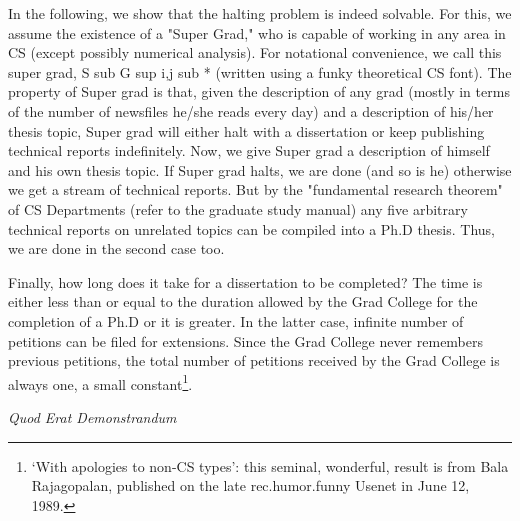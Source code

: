 In the following, we show that the halting problem is indeed solvable. For this, we assume the existence of a "Super Grad," who is capable of working in any area in CS (except possibly numerical analysis). For notational convenience, we call this super grad, S sub G sup i,j sub * (written using a funky theoretical CS font). The property of Super grad is that, given the description of any grad (mostly in terms of the number of newsfiles he/she reads every day) and a description of his/her thesis topic, Super grad will either halt with a dissertation or keep publishing technical reports indefinitely. Now, we give Super grad a description of himself and his own thesis topic. If Super grad halts, we are done (and so is he) otherwise we get a stream of technical reports. But by the "fundamental research theorem" of CS Departments (refer to the graduate study manual) any five arbitrary technical reports on unrelated topics can be compiled into a Ph.D thesis. Thus, we are done in the second case too.

Finally, how long does it take for a dissertation to be completed? The time is either less than or equal to the duration allowed by the Grad College for the completion of a Ph.D or it is greater. In the latter case, infinite number of petitions can be filed for extensions. Since the Grad College never remembers previous petitions, the total number of petitions received by the Grad College is always one, a small constant\footnote{`With apologies to non-CS types': this seminal, wonderful, result is from Bala Rajagopalan, published on the late rec.humor.funny Usenet in June 12, 1989.}.

\bigskip
\bigskip
\bigskip
\bigskip
\bigskip
\bigskip
\bigskip
\bigskip
\bigskip
\bigskip
\bigskip
\bigskip

\hfill \emph{Quod Erat Demonstrandum}
